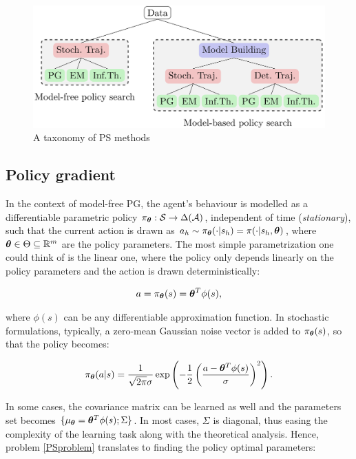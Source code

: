 \begin{figure}[t!]
\centering
\includegraphics[width=\textwidth,height=\textheight,keepaspectratio]{Images/ps_taxonomy.png}
\caption{A taxonomy of \gls{PS} methods \cite{deisenroth2013survey}} \label{fig:PStaxonomy}
\end{figure}



\subsection{Policy gradient}
In the context of model-free \gls{PG}, the agent's behaviour is modelled as a differentiable parametric policy $\pi_{\boldsymbol{\theta}}:\mathcal{S}\to\Delta(\mathcal{A})$, independent of time (\emph{stationary}), such that the current action is drawn as $a_h\sim\pi_{\boldsymbol{\theta}}(\cdot|s_h)=\pi(\cdot|s_h, \boldsymbol{\theta})$, where $\boldsymbol{\theta}\in\Theta\subseteq\mathbb{R}^m$ are the policy parameters. The most simple parametrization one could think of is the linear one, where the policy only depends linearly on the policy parameters and the action is drawn deterministically:

\begin{align}
a = \pi_{\boldsymbol{\theta}}(s) = \boldsymbol{\theta}^T\phi(s),
\end{align}

where $\phi(s)$ can be any differentiable approximation function. In stochastic formulations, typically, a zero-mean Gaussian noise vector is added to $\pi_{\boldsymbol{\theta}}(s)$, so that the policy becomes:

\begin{align}
\pi_{\boldsymbol{\theta}}(a|s) = \frac{1}{\sqrt{2\pi}\sigma}\exp\left(-\frac{1}{2}\left(\frac{a-\boldsymbol{\theta}^T\phi(s)}{\sigma}\right)^2\right).
\end{align}

In some cases, the covariance matrix can be learned as well and the parameters set becomes $\{\mu_{\boldsymbol{\theta}}=\boldsymbol{\theta}^T\phi(s); \Sigma\}$. In most cases, $\Sigma$ is diagonal, thus easing the complexity of the learning task along with the theoretical analysis. Hence, problem \ref{PSproblem} translates to finding the policy optimal parameters:

